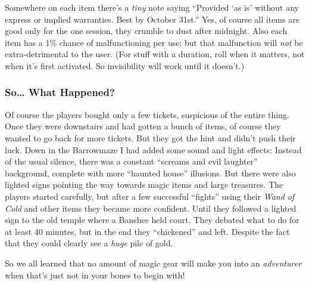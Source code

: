 Somewhere on each item there's a \emph{tiny} note saying ``Provided `as is'
without any express or implied warranties. Best by October 31st.'' Yes, of
course all items are good only for the one session, they crumble to dust after
midnight. Also each item has a 1\% chance of malfunctioning per use; but that
malfunction will \emph{not} be extra-detrimental to the user. (For stuff with
a duration, roll when it matters, not when it's first activated. So invisibility
will work until it doesn't.)

\subsubsection{So\dots{} What Happened?}

Of course the players bought only a few tickets, suspicious of the entire thing.
Once they were downstairs and had gotten a bunch of items, of course they wanted
to go back for more tickets. But they got the hint and didn't push their luck.
Down in the Barrowmaze I had added some sound and light effects: Instead of the
usual silence, there was a constant ``screams and evil laughter'' background,
complete with more ``haunted house'' illusions. But there were also lighted
signs pointing the way towards magic items and large treasures. The players
started carefully, but after a few successful ``fights'' using their
\emph{Wand of Cold} and other items they became more confident. Until they
followed a lighted sign to the old temple where a Banshee held court. They
debated what to do for at least 40 minutes, but in the end they ``chickened''
and left. Despite the fact that they could clearly see a \emph{huge} pile of
gold.

So we all learned that no amount of magic gear will make you into an
\emph{adventurer} when that's just not in your bones to begin with!
\endinput

